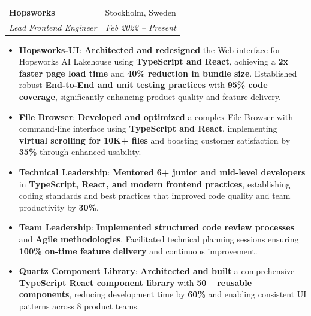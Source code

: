 \documentclass[letterpaper,11pt]{article}
\makeatletter
\newcommand{\resumeItem}[2]{
  \item\small{
    \textbf{#1}{: #2 \vspace{-2pt}}
  }
}
\newcommand{\resumeSubheading}[4]{
  \vspace{-1pt}\item
    \begin{tabular*}{0.97\textwidth}[t]{l@{\extracolsep{\fill}}r}
      \textbf{#1} & #2 \\
      \textit{\small#3} & \textit{\small #4} \\
    \end{tabular*}\vspace{-5pt}
}
\newcommand{\resumeItemListStart}{\begin{itemize}}
\newcommand{\resumeItemListEnd}{\end{itemize}\vspace{-5pt}}
\makeatother
\begin{document}
    \resumeSubheading
      {Hopsworks}{Stockholm, Sweden}
      {Lead Frontend Engineer}{Feb 2022 -- Present}
      \resumeItemListStart
        \resumeItem{Hopsworks-UI}{\textbf{Architected and redesigned} the Web interface for Hopsworks AI Lakehouse using \textbf{TypeScript and React}, achieving a \textbf{2x faster page load time} and \textbf{40\% reduction in bundle size}. Established robust \textbf{End-to-End and unit testing practices} with \textbf{95\% code coverage}, significantly enhancing product quality and feature delivery.}
        \resumeItem{File Browser}{\textbf{Developed and optimized} a complex File Browser with command-line interface using \textbf{TypeScript and React}, implementing \textbf{virtual scrolling for 10K+ files} and boosting customer satisfaction by \textbf{35\%} through enhanced usability.}
        \resumeItem{Technical Leadership}{\textbf{Mentored 6+ junior and mid-level developers} in \textbf{TypeScript, React, and modern frontend practices}, establishing coding standards and best practices that improved code quality and team productivity by \textbf{30\%}.}
        \resumeItem{Team Leadership}{\textbf{Implemented structured code review processes} and \textbf{Agile methodologies}. Facilitated technical planning sessions ensuring \textbf{100\% on-time feature delivery} and continuous improvement.}
        \resumeItem{Quartz Component Library}{\textbf{Architected and built} a comprehensive \textbf{TypeScript React component library} with \textbf{50+ reusable components}, reducing development time by \textbf{60\%} and enabling consistent UI patterns across 8 product teams.}
      \resumeItemListEnd
\end{document}
